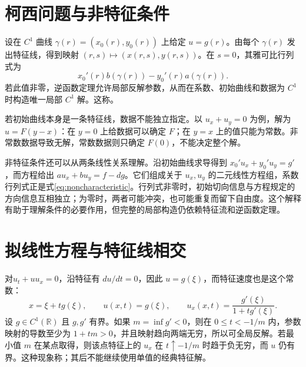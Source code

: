 \documentclass[UTF8,12pt,a4paper,fontset=fandol]{ctexbook}
\begin{document}
\section{柯西问题与非特征条件}
设在 $C^1$ 曲线 $\gamma(r)=(x_0(r),y_0(r))$ 上给定 $u=g(r)$。由每个 $\gamma(r)$ 发出特征线，得到映射 $(r,s)\mapsto(x(r,s),y(r,s))$。在 $s=0$，其雅可比行列式为
\begin{equation}
 x_0'(r)b(\gamma(r))-y_0'(r)a(\gamma(r)).
 \label{eq:noncharacteristic}
\end{equation}
若此值非零，逆函数定理允许局部反解参数，从而在系数、初始曲线和数据为 $C^1$ 时构造唯一局部 $C^1$ 解。这称。

若初始曲线本身是一条特征线，数据不能独立指定。以 $u_x+u_y=0$ 为例，解为 $u=F(y-x)$：在 $y=0$ 上给数据可以确定 $F$；在 $y=x$ 上的值只能为常数。非常数数据导致无解，常数数据则只确定 $F(0)$，不能决定整个解。

非特征条件还可以从两条线性关系理解。沿初始曲线求导得到 $x_0'u_x+y_0'u_y=g'$，而方程给出 $au_x+bu_y=f-dg$。它们组成关于 $u_x,u_y$ 的二元线性方程组，系数行列式正是式\eqref{eq:noncharacteristic}。行列式非零时，初始切向信息与方程规定的方向信息互相独立；为零时，两者可能冲突，也可能重复而留下自由度。这个解释有助于理解条件的必要作用，但完整的局部构造仍依赖特征流和逆函数定理。

\section{拟线性方程与特征线相交}
对$u_t+u u_x=0$，沿特征有 $du/dt=0$，因此 $u=g(\xi)$，而特征速度也是这个常数：
\begin{equation}
 x=\xi+t g(\xi),\qquad u(x,t)=g(\xi),\qquad
 u_x(x,t)=\frac{g'(\xi)}{1+t g'(\xi)}.
 \label{eq:burgers-characteristic}
\end{equation}
设 $g\in C^1(\mathbb R)$ 且 $g,g'$ 有界。如果 $m=\inf g'<0$，则在 $0\le t<-1/m$ 内，参数映射的导数至少为 $1+tm>0$，并且映射趋向两端无穷，所以可全局反解。若最小值 $m$ 在某点取得，则该点特征上的 $u_x$ 在 $t\uparrow-1/m$ 时趋于负无穷，而 $u$ 仍有界。这种现象称；其后不能继续使用单值的经典特征解。
\end{document}
